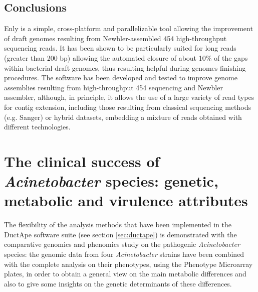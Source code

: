 \subsection{Conclusions}
Enly is a simple, cross-platform and parallelizable tool allowing the improvement of draft genomes resulting from Newbler-assembled 454 high-throughput sequencing reads. It has been shown to be particularly suited for long reads (greater than 200 bp) allowing the automated closure of about 10\% of the gaps within bacterial draft genomes, thus resulting helpful during genomes finishing procedures. The software has been developed and tested to improve genome assemblies resulting from high-throughput 454 sequencing and Newbler assembler, although, in principle, it allows the use of a large variety of read types for contig extension, including those resulting from classical sequencing methods (e.g. Sanger) or hybrid datasets, embedding a mixture of reads obtained with different technologies.

\newpage
\section{The clinical success of \textit{Acinetobacter} species: genetic, metabolic and virulence attributes}
The flexibility of the analysis methods that have been implemented in the DuctApe software suite (see section \ref{sec:ductape}) is demonstrated with the comparative genomics and phenomics study on the pathogenic \textit{Acinetobacter} species: the genomic data from four \textit{Acinetobacter} strains have been combined with the complete analysis on their phenotypes, using the Phenotype Microarray plates, in order to obtain a general view on the main metabolic differences and also to give some insights on the genetic determinants of these differences.

\newpage



\backmatter
{}
\renewcommand{\sectionmark}[1]{\markright{#1}}
\sectionmark{Bibliography}
